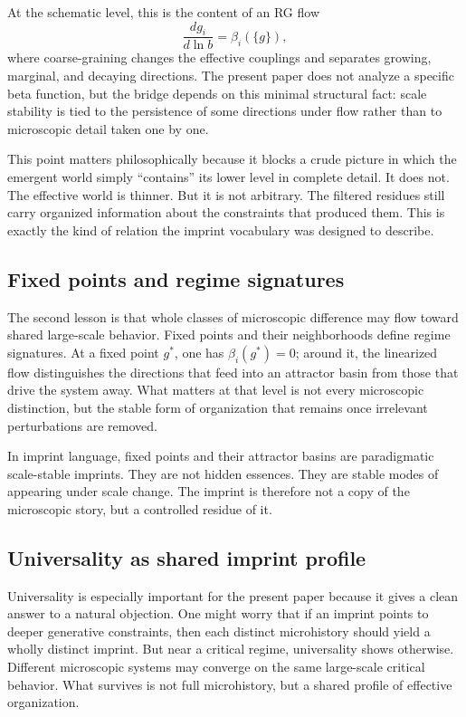 \documentclass[12pt]{article}
\begin{document}
At the schematic level, this is the content of an RG flow
\[
\frac{d g_i}{d \ln b} = \beta_i(\{g\}),
\]
where coarse-graining changes the effective couplings and separates growing, marginal, and decaying directions. The present paper does not analyze a specific beta function, but the bridge depends on this minimal structural fact: scale stability is tied to the persistence of some directions under flow rather than to microscopic detail taken one by one.

This point matters philosophically because it blocks a crude picture in which the emergent world simply ``contains'' its lower level in complete detail. It does not. The effective world is thinner. But it is not arbitrary. The filtered residues still carry organized information about the constraints that produced them. This is exactly the kind of relation the imprint vocabulary was designed to describe.

\subsection{Fixed points and regime signatures}

The second lesson is that whole classes of microscopic difference may flow toward shared large-scale behavior. Fixed points and their neighborhoods define regime signatures. At a fixed point \(g^\ast\), one has \(\beta_i(g^\ast)=0\); around it, the linearized flow distinguishes the directions that feed into an attractor basin from those that drive the system away. What matters at that level is not every microscopic distinction, but the stable form of organization that remains once irrelevant perturbations are removed.

In imprint language, fixed points and their attractor basins are paradigmatic scale-stable imprints. They are not hidden essences. They are stable modes of appearing under scale change. The imprint is therefore not a copy of the microscopic story, but a controlled residue of it.

\subsection{Universality as shared imprint profile}

Universality is especially important for the present paper because it gives a clean answer to a natural objection. One might worry that if an imprint points to deeper generative constraints, then each distinct microhistory should yield a wholly distinct imprint. But near a critical regime, universality shows otherwise. Different microscopic systems may converge on the same large-scale critical behavior. What survives is not full microhistory, but a shared profile of effective organization.
\end{document}
